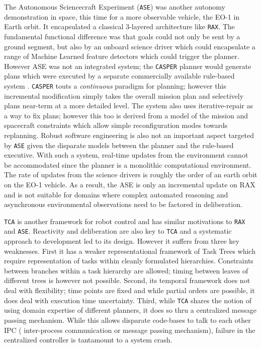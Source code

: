 The Autonomous Sciencecraft Experiment (\texttt{ASE}) \cite{chien99,
  chien03} was another autonomy demonstration in space, this time for
a more observable vehicle, the EO-1 in Earth orbit. It encapsulated a
classical 3-layered architecture like \texttt{RAX}. The fundamental
functional difference was that goals could not only be sent by a
ground segment, but also by an onboard science driver which could
encapsulate a range of Machine Learned feature detectors which could
trigger the planner. However ASE was not an integrated system; the
\texttt{CASPER} planner \cite{chien00} would generate plans which were
executed by a separate commercially available rule-based system
\cite{icl}. \texttt{CASPER} touts a \emph{continuous} paradigm for
planning; however this incremental modification simply takes the
overall mission plan and selectively plans near-term at a more
detailed level. The system also uses iterative-repair as a way to fix
plans; however this too is derived from a model of the mission and
spacecraft constraints which allow simple reconfiguration modes
towards replanning. Robust software engineering is also not an
important aspect targeted by \texttt{ASE} given the disparate models
between the planner and the rule-based executive. With such a system,
real-time updates from the environment cannot be accommodated since
the planner is a monolithic computational environment. The rate of
updates from the science drivers is roughly  the order of
an earth orbit on the EO-1 vehicle. As a result, the ASE is only an
incremental update on RAX and is not suitable for domains where
complex automated reasoning and asynchronous environmental
observations need to be factored in deliberation.

\texttt{TCA} \cite{simmons94} is another framework for robot control
and has similar motivations to \texttt{RAX} and
\texttt{ASE}. Reactivity and deliberation are also key to \texttt{TCA}
and a systematic approach to development led to its design. However it
suffers from three key weaknesses. First it has a weaker
representational framework of Task Trees which require representation
of tasks within cleanly formulated hierarchies. Constraints between
branches within a task hierarchy are allowed; timing between leaves of
different trees is however not possible. Second, its temporal
framework does not deal with flexibility; time points are fixed and
while partial orders are possible, it does deal with execution time
uncertainty. Third, while \texttt{TCA} shares the notion of using
domain expertise of different planners, it does so thru a centralized
message passing mechanism. While this allows disparate code-bases to
talk to each other  IPC ( inter-process
communication or message passing mechanism), failure in the
centralized controller is tantamount to a system crash.

